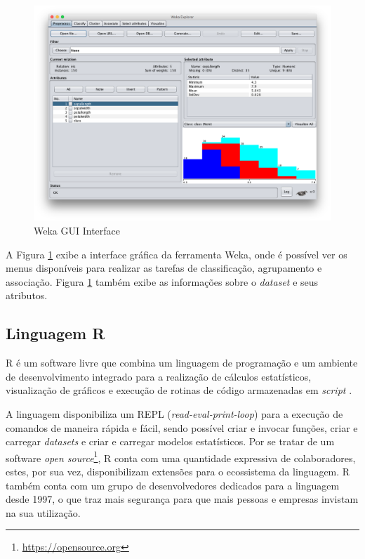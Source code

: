 \begin{figure}[htb]
  \caption{\label{fig:weka}Weka GUI Interface}
  \begin{center}
    \includegraphics[scale=0.4]{imagens/weka.png}
  \end{center}
\end{figure}
\newpage

A Figura \ref{fig:weka} exibe a interface gráfica da ferramenta Weka, onde é possível ver os menus disponíveis para realizar as tarefas de classificação,  agrupamento e associação. Figura \ref{fig:weka} também exibe as informações sobre o \textit{dataset} e seus atributos.

\subsection{Linguagem R}
R é um software livre que combina um linguagem de programação e um ambiente de desenvolvimento integrado para a realização de cálculos estatísticos, visualização de gráficos e execução de rotinas de código armazenadas em \textit{script} \cite{Team2018}.

A linguagem disponibiliza um REPL (\textit{read-eval-print-loop}) para a execução de comandos de maneira rápida e fácil, sendo possível criar e invocar funções, criar e carregar \textit{datasets} e criar e carregar modelos estatísticos. Por se tratar de um software \textit{open source}\footnote{\url{https://opensource.org}}, R conta com uma quantidade expressiva de colaboradores, estes, por sua vez, disponibilizam extensões para o ecossistema da linguagem. R também conta com um grupo de desenvolvedores dedicados para a linguagem desde 1997, o que traz mais segurança para que mais pessoas e empresas invistam na sua utilização.


